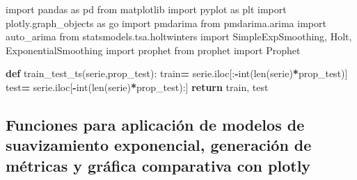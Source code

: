 \documentclass[
]{book}
\newenvironment{Shaded}{\begin{snugshade}}{\end{snugshade}}
\newcommand{\BuiltInTok}[1]{#1}
\newcommand{\ControlFlowTok}[1]{\textcolor[rgb]{0.13,0.29,0.53}{\textbf{#1}}}
\newcommand{\ImportTok}[1]{#1}
\newcommand{\KeywordTok}[1]{\textcolor[rgb]{0.13,0.29,0.53}{\textbf{#1}}}
\newcommand{\NormalTok}[1]{#1}
\newcommand{\OperatorTok}[1]{\textcolor[rgb]{0.81,0.36,0.00}{\textbf{#1}}}
\begin{document}
\begin{Shaded}
\begin{Highlighting}[]

\ImportTok{import}\NormalTok{ pandas }\ImportTok{as}\NormalTok{ pd}
\ImportTok{from}\NormalTok{ matplotlib }\ImportTok{import}\NormalTok{ pyplot }\ImportTok{as}\NormalTok{ plt}
\ImportTok{import}\NormalTok{ plotly.graph\_objects }\ImportTok{as}\NormalTok{ go}
\ImportTok{import}\NormalTok{ pmdarima}
\ImportTok{from}\NormalTok{ pmdarima.arima }\ImportTok{import}\NormalTok{ auto\_arima}
\ImportTok{from}\NormalTok{ statsmodels.tsa.holtwinters }\ImportTok{import}\NormalTok{ SimpleExpSmoothing, Holt, ExponentialSmoothing}
\ImportTok{import}\NormalTok{ prophet}
\ImportTok{from}\NormalTok{ prophet }\ImportTok{import}\NormalTok{ Prophet}


\KeywordTok{def}\NormalTok{ train\_test\_ts(serie,prop\_test):}
\NormalTok{    train}\OperatorTok{=}\NormalTok{ serie.iloc[:}\OperatorTok{{-}}\BuiltInTok{int}\NormalTok{(}\BuiltInTok{len}\NormalTok{(serie)}\OperatorTok{*}\NormalTok{prop\_test)]}
\NormalTok{    test}\OperatorTok{=}\NormalTok{ serie.iloc[}\OperatorTok{{-}}\BuiltInTok{int}\NormalTok{(}\BuiltInTok{len}\NormalTok{(serie)}\OperatorTok{*}\NormalTok{prop\_test):]}
    \ControlFlowTok{return}\NormalTok{ train, test}
  
  
\end{Highlighting}
\end{Shaded}

\hypertarget{funciones-para-aplicaciuxf3n-de-modelos-de-suavizamiento-exponencial-generaciuxf3n-de-muxe9tricas-y-gruxe1fica-comparativa-con-plotly}{%
\subsection{Funciones para aplicación de modelos de suavizamiento exponencial, generación de métricas y gráfica comparativa con plotly}\label{funciones-para-aplicaciuxf3n-de-modelos-de-suavizamiento-exponencial-generaciuxf3n-de-muxe9tricas-y-gruxe1fica-comparativa-con-plotly}}
\end{document}
